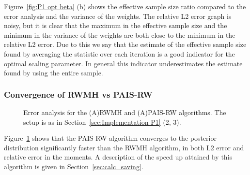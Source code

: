 \documentclass[final]{siamltex}
\begin{document}
Figure~\ref{fig:P1 opt beta} (b) shows the effective sample size ratio compared to the error analysis and the variance of the weights. The relative L2 error graph is noisy, but it is clear that the maximum in the effective sample size and the minimum in the variance of the weights are both close to the minimum in the relative L2 error. Due to this we say that the estimate of the effective sample size found by averaging the statistic over each iteration is a good indicator for the optimal scaling parameter. In general this indicator underestimates the estimate found by using the entire sample.

\subsubsection{Convergence of RWMH vs PAIS-RW}

\begin{figure}[htb]
\centering
{}
\caption{Error analysis for the (A)RWMH and (A)PAIS-RW algorithms. The setup is as in Section~\ref{sec:Implementation P1} (2, 3).}
\label{fig:MH1 L2}
\end{figure}

Figure~\ref{fig:MH1 L2} shows that the PAIS-RW algorithm converges to the posterior distribution significantly faster than the RWMH algorithm, in both L2 error and relative error in the moments. A description of the speed up attained by this algorithm is given in Section~\ref{sec:calc_saving}.
\end{document}
